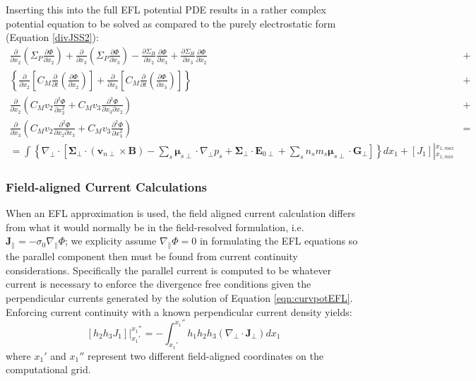\documentclass[11pt,letterpaper]{article}
\begin{document}
Inserting this into the full EFL potential PDE results in a rather complex potential equation to be solved as compared to the purely electrostatic form (Equation \ref{divJSS2}):
\begin{eqnarray}
\frac{\partial}{\partial x_2} \left( \Sigma_P \frac{\partial \Phi}{\partial x_2} \right) + \frac{\partial}{\partial x_3} \left( \Sigma_P \frac{\partial \Phi}{\partial x_3} \right) -  \frac{\partial \Sigma_H}{\partial x_2} \frac{\partial \Phi}{\partial x_3} + \frac{\partial \Sigma_H}{\partial x_3} \frac{\partial \Phi}{\partial x_2} &+& \nonumber \\ 
\left\{ \frac{\partial}{\partial x_2} \left[ C_M \frac{\partial}{\partial t} \left( \frac{\partial \Phi}{\partial x_2} \right) \right] + \frac{\partial}{\partial x_3} \left[ C_M \frac{\partial}{\partial t} \left( \frac{\partial \Phi}{\partial x_3} \right) \right] \right\} &+& \nonumber \\
\frac{\partial}{\partial x_2} \left( C_M v_2 \frac{\partial^2 \Phi}{\partial x_2^2} + C_M v_3 \frac{\partial^2 \Phi}{\partial x_3 \partial x_2} \right) &+& \nonumber \\
\frac{\partial}{\partial x_3} \left( C_M v_2 \frac{\partial^2 \Phi}{\partial x_2 \partial x_3} + C_M v_3 \frac{\partial^2 \Phi}{\partial x_3^2} \right) &=& \nonumber \\
= \int \left\{ \nabla_\perp \cdot \left[ \boldsymbol{\Sigma}_\perp \cdot \left( \mathbf{v}_{n\perp} \times \mathbf{B} \right)  - \sum_s \boldsymbol{\mu}_{s\perp} \cdot \nabla_\perp p_s + \boldsymbol{\Sigma}_\perp \cdot \mathbf{E}_{0\perp} + \sum_s n_s m_s  \boldsymbol{\mu}_{s\perp} \cdot \mathbf{G}_\perp \right] \right\} d x_1 + \left[J_1 \right] \left|^{x_{1,max}}_{x_{1,min}} \right. \label{eqn:electrodynamic}
\end{eqnarray}

\subsubsection{Field-aligned Current Calculations}

When an EFL approximation is used, the field aligned current calculation differs from what it would normally be in the field-resolved formulation, i.e. $\mathbf{J}_\parallel=-\sigma_0 \nabla_\parallel \Phi$; we explicity assume $\nabla_\parallel \Phi = 0$ in formulating the EFL equations so the parallel component then must be found from current continuity considerations.  Specifically the parallel current is computed to be whatever current is necessary to enforce the divergence free conditions given the perpendicular currents generated by the solution of Equation \ref{eqn:curvpotEFL}.  Enforcing current continuity with a known perpendicular current density yields:
\begin{equation}
\left. \left[ h_2 h_3 J_1 \right] \right|_{x_1'}^{x_1''} = - \int_{x_1'}^{x_{1}''} h_1 h_2 h_3 \left( \nabla_\perp \cdot \mathbf{J}_\perp \right) d x_1 \label{eqn:FACcalc}
\end{equation}
where $x_1'$ and $x_1''$ represent two different field-aligned coordinates on the computational grid.  
\end{document}
